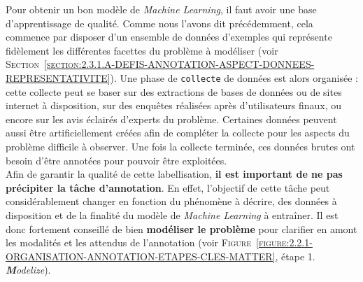 			Pour obtenir un bon modèle de \textit{Machine Learning}, il faut avoir une base d’apprentissage de qualité.
			Comme nous l'avons dit précédemment, cela commence par disposer d'un ensemble de données d'exemples qui représente fidèlement les différentes facettes du problème à modéliser (voir \textsc{Section~\ref{section:2.3.1.A-DEFIS-ANNOTATION-ASPECT-DONNEES-REPRESENTATIVITE}}).
			Une phase de \texttt{collecte} de données est alors organisée : cette collecte peut se baser sur des extractions de bases de données ou de sites internet à disposition, sur des enquêtes réalisées après d'utilisateurs finaux, ou encore sur les avis éclairés d'experts du problème.
			Certaines données peuvent aussi être artificiellement créées afin de compléter la collecte pour les aspects du problème difficile à observer.
			Une fois la collecte terminée, ces données brutes ont besoin d'être annotées pour pouvoir être exploitées. \\
			
			
			Afin de garantir la qualité de cette labellisation, \textbf{il est important de ne pas précipiter la tâche d'annotation}.
			En effet, l'objectif de cette tâche peut considérablement changer en fonction du phénomène à décrire, des données à disposition et de la finalité du modèle de \textit{Machine Learning} à entraîner.
			Il est donc fortement conseillé de bien \textbf{modéliser le problème} pour clarifier en amont les modalités et les attendus de l'annotation (voir \textsc{Figure~\ref{figure:2.2.1-ORGANISATION-ANNOTATION-ETAPES-CLES-MATTER}}, étape 1. \textit{\textbf{M}odelize}).
			
